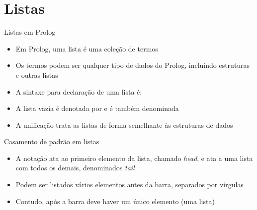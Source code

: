 \section{Listas}

\begin{frame}[fragile]{Listas em Prolog}

    \begin{itemize}
        \item Em Prolog, uma lista é uma coleção de termos

        \item Os termos podem ser qualquer tipo de dados do Prolog, incluindo estruturas e 
            outras listas

        \item A sintaxe para declaração de uma lista é:


        \item A lista vazia é denotada por  e é também denominada 

        \item A unificação trata as listas de forma semelhante às estruturas de dados


    \end{itemize}

\end{frame}

\begin{frame}[fragile]{Casamento de padrão em listas}

    \begin{itemize}
        \item A notação  ata  ao primeiro elemento da 
            lista, chamado \textit{head}, e ata  a uma lista com todos os 
            demais, denominados \textit{tail}


        \item Podem ser listados vários elementos antes da barra, separados por vírgulas

        \item Contudo, após a barra deve haver um único elemento (uma lista)


    \end{itemize}

\end{frame}

